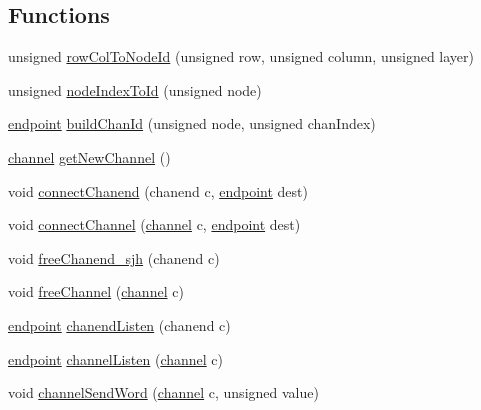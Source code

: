 \subsection*{Functions}
\begin{DoxyCompactItemize}
\item 
unsigned \hyperlink{_swallow-helpers_8xc_aba1d74fda7711c040523169918cf186c}{row\+Col\+To\+Node\+Id} (unsigned row, unsigned column, unsigned layer)
\item 
unsigned \hyperlink{_swallow-helpers_8xc_a58f5683194e9d62e69b9d73ce1416055}{node\+Index\+To\+Id} (unsigned node)
\item 
\hyperlink{_swallow-helpers_8h_ab1358ba323e68c233f100abc11bdc7ea}{endpoint} \hyperlink{_swallow-helpers_8xc_a096630d81be63da93af11a77c35163e8}{build\+Chan\+Id} (unsigned node, unsigned chan\+Index)
\item 
\hyperlink{_swallow-helpers_8h_aa6ea79b51cb1a11714e12ddd689dd15c}{channel} \hyperlink{_swallow-helpers_8xc_ae766ff2b68dabf370997e2005ce2dc4d}{get\+New\+Channel} ()
\item 
void \hyperlink{_swallow-helpers_8xc_acea152b967b1954ceec7cc18acaec48d}{connect\+Chanend} (chanend c, \hyperlink{_swallow-helpers_8h_ab1358ba323e68c233f100abc11bdc7ea}{endpoint} dest)
\item 
void \hyperlink{_swallow-helpers_8xc_a4fc6da8d25bce838539832b011089fb2}{connect\+Channel} (\hyperlink{_swallow-helpers_8h_aa6ea79b51cb1a11714e12ddd689dd15c}{channel} c, \hyperlink{_swallow-helpers_8h_ab1358ba323e68c233f100abc11bdc7ea}{endpoint} dest)
\item 
void \hyperlink{_swallow-helpers_8xc_acb55a62300229638e574bc20c8d8d245}{free\+Chanend\+\_\+sjh} (chanend c)
\item 
void \hyperlink{_swallow-helpers_8xc_a7821533e38b1011d9ce4ba11bb458136}{free\+Channel} (\hyperlink{_swallow-helpers_8h_aa6ea79b51cb1a11714e12ddd689dd15c}{channel} c)
\item 
\hyperlink{_swallow-helpers_8h_ab1358ba323e68c233f100abc11bdc7ea}{endpoint} \hyperlink{_swallow-helpers_8xc_a6460b117129f2bfbd74efd3cee5da9e0}{chanend\+Listen} (chanend c)
\item 
\hyperlink{_swallow-helpers_8h_ab1358ba323e68c233f100abc11bdc7ea}{endpoint} \hyperlink{_swallow-helpers_8xc_a9e2783667dec0a1a6a2c657b3b46e1a2}{channel\+Listen} (\hyperlink{_swallow-helpers_8h_aa6ea79b51cb1a11714e12ddd689dd15c}{channel} c)
\item 
void \hyperlink{_swallow-helpers_8xc_a722c9a50b1ba184815f3ca8de58c331f}{channel\+Send\+Word} (\hyperlink{_swallow-helpers_8h_aa6ea79b51cb1a11714e12ddd689dd15c}{channel} c, unsigned value)

\end{DoxyCompactItemize}
